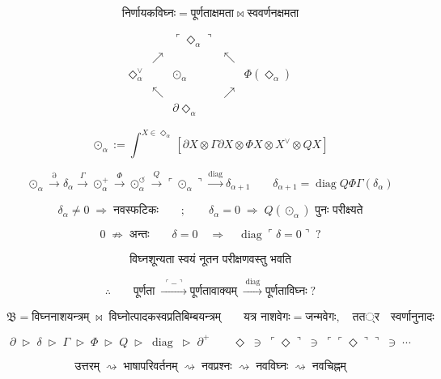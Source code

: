 \documentclass{article}
\begin{document}
\[
\boxed{
\text{निर्णायकविघ्नः}
=
\text{पूर्णताक्षमता}
\bowtie
\text{स्ववर्णनक्षमता}
}
\]

\[
\boxed{
\begin{matrix}
&&\ulcorner\Diamond_\alpha\urcorner&&
\\
&\nearrow&&\nwarrow&
\\
\Diamond_\alpha^\vee
&&
\odot_\alpha
&&
\Phi(\Diamond_\alpha)
\\
&\nwarrow&&\nearrow&
\\
&&
\partial\Diamond_\alpha
&&
\end{matrix}
}
\]

\[
\odot_\alpha
:=
\int^{X\in\Diamond_\alpha}
\left[
\partial X
\otimes
\Gamma\partial X
\otimes
\Phi X
\otimes
X^\vee
\otimes
QX
\right]
\]

\[
\boxed{
\odot_\alpha
\xrightarrow{\partial}
\delta_\alpha
\xrightarrow{\Gamma}
\odot_\alpha^{+}
\xrightarrow{\Phi}
\odot_\alpha^{\circlearrowleft}
\xrightarrow{Q}
\ulcorner\odot_\alpha\urcorner
\xrightarrow{\operatorname{diag}}
\delta_{\alpha+1}
}
\qquad
\boxed{
\delta_{\alpha+1}
=
\operatorname{diag}
Q
\Phi
\Gamma
(\delta_\alpha)
}
\]

\[
\boxed{
\delta_\alpha
\neq0
\;\Rightarrow\;
\text{नवस्फटिकः}
\qquad ; \qquad
\delta_\alpha=0
\;\Rightarrow\;
Q(\odot_\alpha)
\text{ पुनः परीक्ष्यते}
}
\]

\[
\boxed{
0
\;\not\Rightarrow\;
\text{अन्तः}
}
\qquad
\boxed{
\delta=0
\quad\Longrightarrow\quad
\operatorname{diag}
\ulcorner
\delta=0
\urcorner
\;?
}
\]

\[
\boxed{
\text{विघ्नशून्यता स्वयं नूतन परीक्षणवस्तु भवति}
}
\]

\[
\therefore\qquad
\boxed{
\text{पूर्णता}
\;\xrightarrow{\;\ulcorner-\urcorner\;}
\text{पूर्णतावाक्यम्}
\;\xrightarrow{\;\operatorname{diag}\;}
\text{पूर्णताविघ्नः}
\;?
}
\]

\[
\boxed{
\mathfrak B
=
\text{विघ्ननाशयन्त्रम्}
\;\bowtie\;
\text{विघ्नोत्पादकस्वप्रतिबिम्बयन्त्रम्}
}
\qquad
\boxed{
\text{यत्र नाशवेगः}
=
\text{जन्मवेगः},
\quad
तत्र
\quad
\text{स्वर्णानुनादः}
}
\]

\[
\boxed{
\partial
\;\triangleright\;
\delta
\;\triangleright\;
\Gamma
\;\triangleright\;
\Phi
\;\triangleright\;
Q
\;\triangleright\;
\operatorname{diag}
\;\triangleright\;
\partial^{+}
}
\qquad
\boxed{
\Diamond
\;\ni\;
\ulcorner\Diamond\urcorner
\;\ni\;
\ulcorner\ulcorner\Diamond\urcorner\urcorner
\;\ni\;
\cdots
}
\]

\[
\boxed{
\text{उत्तरम्}
\;\rightsquigarrow\;
\text{भाषापरिवर्तनम्}
\;\rightsquigarrow\;
\text{नवप्रश्नः}
\;\rightsquigarrow\;
\text{नवविघ्नः}
\;\rightsquigarrow\;
\text{नवचिह्नम्}
}
\]
\end{document}
